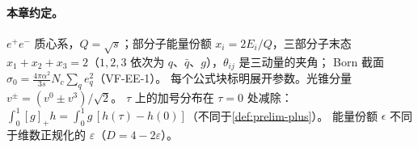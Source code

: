 \paragraph{本章约定。}
$e^+e^-$ 质心系，$Q=\sqrt s$；部分子能量份额 $x_i=2E_i/Q$，三部分子末态 $x_1+x_2+x_3=2$（$1,2,3$ 依次为 $q$、$\bar q$、$g$），$\theta_{ij}$ 是三动量的夹角；
Born 截面 $\sigma_0=\frac{4\pi\alpha^2}{3s}N_c\sum_qe_q^2$（VF-EE-1）。%
每个公式块标明展开参数。光锥分量 $v^\pm=(v^0\pm v^3)/\sqrt2$。
$\tau$ 上的加号分布在 $\tau=0$ 处减除：$\int_0^1[g]_+h=\int_0^1g\,[h(\tau)-h(0)]$（不同于\cref{def:prelim-plus}）。
能量份额 $\epsilon$ 不同于维数正规化的 $\varepsilon$（$D=4-2\varepsilon$）。
